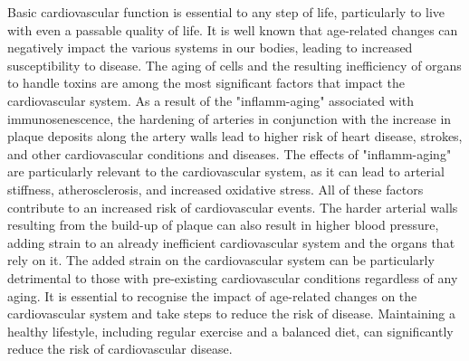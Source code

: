 \documentclass{article}
\begin{document}
Basic cardiovascular function is essential to any step of life, particularly to live with even a passable quality of life. It is well known that age-related changes can negatively impact the various systems in our bodies, leading to increased susceptibility to disease. The aging of cells and the resulting inefficiency of organs to handle toxins are among the most significant factors that impact the cardiovascular system. As a result of the "inflamm-aging" associated with immunosenescence, the hardening of arteries in conjunction with the increase in plaque deposits along the artery walls lead to higher risk of heart disease, strokes, and other cardiovascular conditions and diseases. The effects of "inflamm-aging" are particularly relevant to the cardiovascular system, as it can lead to arterial stiffness, atherosclerosis, and increased oxidative stress. All of these factors contribute to an increased risk of cardiovascular events. The harder arterial walls resulting from the build-up of plaque can also result in higher blood pressure, adding strain to an already inefficient cardiovascular system and the organs that rely on it. The added strain on the cardiovascular system can be particularly detrimental to those with pre-existing cardiovascular conditions regardless of any aging. It is essential to recognise the impact of age-related changes on the cardiovascular system and take steps to reduce the risk of disease. Maintaining a healthy lifestyle, including regular exercise and a balanced diet, can significantly reduce the risk of cardiovascular disease.
\end{document}
